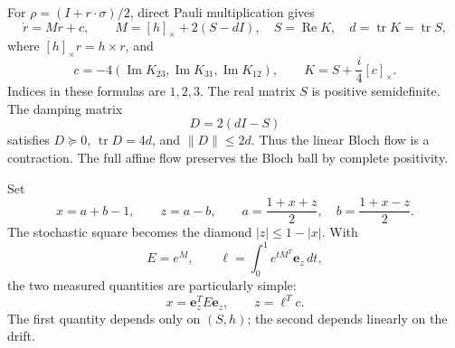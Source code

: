 \documentclass[11pt]{article}
\theoremstyle{definition}
\theoremstyle{remark}
\DeclareMathOperator{\tr}{tr}
\DeclareMathOperator{\Rea}{Re}
\DeclareMathOperator{\Ima}{Im}
\newcommand{\ee}{\mathbf e_z}
\newcommand{\PSD}{\succeq0}
\begin{document}
For \(\rho=(I+r\cdot\sigma)/2\), direct Pauli multiplication gives
\begin{equation}\label{eq:bloch}
 \dot r=Mr+c,\qquad
 M=[h]_\times+2(S-dI),\quad S=\Rea K,\quad d=\tr K=\tr S,
\end{equation}
where \([h]_\times r=h\times r\), and
\begin{equation}\label{eq:drift}
 c=-4(\Ima K_{23},\Ima K_{31},\Ima K_{12}),\qquad
 K=S+\frac{i}{4}[c]_\times.
\end{equation}
Indices in these formulas are \(1,2,3\). The real matrix \(S\) is positive semidefinite. The damping matrix
\begin{equation}\label{eq:damping}
 D=2(dI-S)
\end{equation}
satisfies \(D\PSD\), \(\tr D=4d\), and \(\|D\|\leq2d\). Thus the linear Bloch flow is a contraction. The full affine flow preserves the Bloch ball by complete positivity.

Set
\begin{equation}\label{eq:xz}
 x=a+b-1,\qquad z=a-b,
 \qquad a=\frac{1+x+z}{2},\quad b=\frac{1+x-z}{2}.
\end{equation}
The stochastic square becomes the diamond \(|z|\leq1-|x|\). With
\begin{equation}\label{eq:linear-readout}
 E=e^M,\qquad \ell=\int_0^1e^{tM^T}\ee\,dt,
\end{equation}
the two measured quantities are particularly simple:
\begin{equation}\label{eq:xz-readout}
 x=\ee^T E\ee,\qquad z=\ell^Tc.
\end{equation}
The first quantity depends only on \((S,h)\); the second depends linearly on the drift.
\end{document}
